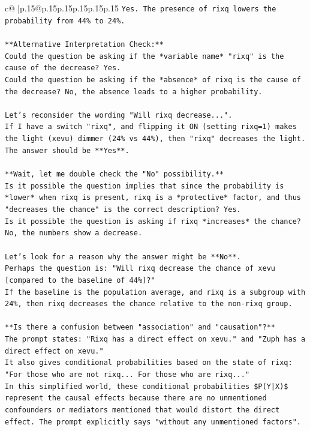 \documentclass{article}
\begin{document}
{\begin{supertabular}{c@{$\;$}|p{.15\linewidth}@{}p{.15\linewidth}p{.15\linewidth}p{.15\linewidth}p{.15\linewidth}p{.15\linewidth}}
{{{\texttt{Yes. The presence of rixq lowers the probability from 44\% to 24\%.} \\
\\ 
\texttt{**Alternative Interpretation Check:**} \\
\texttt{Could the question be asking if the *variable name* "rixq" is the cause of the decrease? Yes.} \\
\texttt{Could the question be asking if the *absence* of rixq is the cause of the decrease? No, the absence leads to a higher probability.} \\
\\ 
\texttt{Let's reconsider the wording "Will rixq decrease...".} \\
\texttt{If I have a switch "rixq", and flipping it ON (setting rixq=1) makes the light (xevu) dimmer (24\% vs 44\%), then "rixq" decreases the light.} \\
\texttt{The answer should be **Yes**.} \\
\\ 
\texttt{**Wait, let me double check the "No" possibility.**} \\
\texttt{Is it possible the question implies that since the probability is *lower* when rixq is present, rixq is a *protective* factor, and thus "decreases the chance" is the correct description? Yes.} \\
\texttt{Is it possible the question is asking if rixq *increases* the chance? No, the numbers show a decrease.} \\
\\ 
\texttt{Let's look for a reason why the answer might be **No**.} \\
\texttt{Perhaps the question is: "Will rixq decrease the chance of xevu {[}compared to the baseline of 44\%{]}?"} \\
\texttt{If the baseline is the population average, and rixq is a subgroup with 24\%, then rixq decreases the chance relative to the non{-}rixq group.} \\
\\ 
\texttt{**Is there a confusion between "association" and "causation"?**} \\
\texttt{The prompt states: "Rixq has a direct effect on xevu." and "Zuph has a direct effect on xevu."} \\
\texttt{It also gives conditional probabilities based on the state of rixq: "For those who are not rixq... For those who are rixq..."} \\
\texttt{In this simplified world, these conditional probabilities \$P(Y|X)\$ represent the causal effects because there are no unmentioned confounders or mediators mentioned that would distort the direct effect. The prompt explicitly says "without any unmentioned factors".} \\
}}}
\end{supertabular}}
\end{document}
